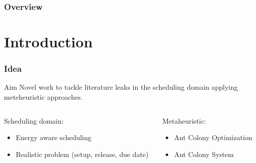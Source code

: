 
\begin{frame}
\titlepage %
\end{frame}


\begin{frame} \frametitle{Overview} %
\tableofcontents[hideallsubsections] %
\end{frame}

\section{Introduction}


\begin{frame} \frametitle{Idea}

\begin{block}{Aim}
	Novel work to tackle literature leaks in the scheduling domain applying meteheuristic approaches.
\end{block}

\medskip
\begin{columns}[c]
	\begin{column}[c]{6cm}
		Scheduling domain:
		\begin{itemize}
			\item Energy aware scheduling
			\item Realistic problem (setup, release, due date)
		\end{itemize}
	\end{column}
	\pause
	\begin{column}[c]{6cm}
		Metaheuristic:
		\begin{itemize}
			\item Ant Colony Optimization
			\item Ant Colony System
		\end{itemize}
	\end{column}
\end{columns}

\end{frame}


